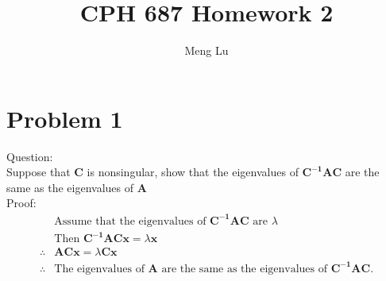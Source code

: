 \documentclass{article}
\begin{document}
 



\title{CPH 687 Homework 2}
\author{\small{Meng Lu}}


\maketitle
\section{Problem 1}
Question: \\
Suppose that $\bm{C}$ is nonsingular, show that the eigenvalues of
$\bm{C^{-1}AC}$ are the same as the eigenvalues of $\bm{A}$\\
Proof:\\
     \begin{align*}
       &\text{Assume that the eigenvalues of }\bm{C^{-1}AC}\text{ are }\lambda\\
       &\text{Then }\bm{C^{-1}ACx}=\lambda \bm{x}\\
       \therefore &\bm{ACx}=\lambda \bm{Cx}\\
       \therefore &\text{The eigenvalues of }\bm{A} \text{ are the same as
       the eigenvalues of }\bm{C^{-1}AC}
     .
     \end{align*}
     
    
            
            
\end{document}
